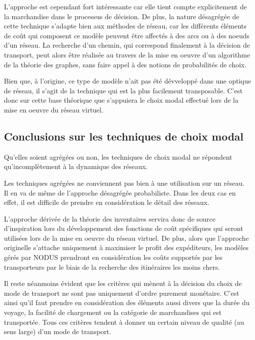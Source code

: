 L'approche est cependant fort intéressante car elle tient compte explicitement
de la marchandise dans le processus de décision. De plus, la nature désagrégée
de cette technique s'adapte bien aux méthodes de réseau, car les différents
éléments de coût qui composent ce modèle peuvent être affectés à des arcs ou à
des noeuds d'un réseau. La recherche d'un chemin, qui correspond finalement à la
décision de transport, peut alors être réalisée au travers de la mise en oeuvre
d'un algorithme de la théorie des graphes, sans faire appel à des notions de
probabilités de choix.

Bien que, à l'origine, ce type de modèle n'ait pas été dévveloppé dans une
optique de réseau, il s'agit de la technique qui est la plus facilement
transposable. C'est donc sur cette base théorique que s'appuiera le choix modal
effectué lors de la mise en oeuvre du réseau virtuel.

\subsection{Conclusions sur les techniques de choix modal}

Qu'elles soient agrégées ou non, les techniques de choix modal ne répondent
qu'incomplètement à la dynamique des réseaux.

Les techniques agrégées ne conviennent pas bien à une utilisation sur un réseau.
Il en va de même de l'approche désagrégée probabiliste. Dans les deux cas en
effet, il est difficile de prendre en considération le détail des réseaux.

L'approche dérivée de la théorie des inventaires servira donc de source
d'inspi\-ra\-tion lors du développement des fonctions de coût spécifiques qui
seront utilisées lors de la mise en oeuvre du réseau virtuel. De plus, alors que
l'approche originelle s'attache uniquement à maximiser le profit des
expéditeurs, les modèles gérés par NODUS prendront en considération les coûts
supportés par les transpor\-teurs par le biais de la recherche des itinéraires les
moins chers.

Il reste néanmoins évident que les critères qui mènent à la décision du choix de
mode de transport ne sont pas uniquement d'ordre purement monétaire. C'est ainsi
qu'il faut prendre en considération des éléments aussi divers que la durée du
voyage, la facilité de chargement ou la catégorie de marchandises qui est
transportée. Tous ces critères tendent à donner un certain niveau de qualité (au
sens large) d'un mode de transport.


